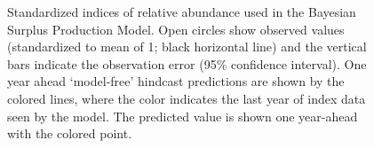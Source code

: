 \documentclass[
  11pt,
]{SCreport}
\begin{document}
\begin{figure}[H]


\caption{\label{fig-hcxval}Standardized indices of relative abundance
used in the Bayesian Surplus Production Model. Open circles show
observed values (standardized to mean of 1; black horizontal line) and
the vertical bars indicate the observation error (95\% confidence
interval). One year ahead `model-free' hindcast predictions are shown by
the colored lines, where the color indicates the last year of index data
seen by the model. The predicted value is shown one year-ahead with the
colored point.}

\end{figure}%
\end{document}
